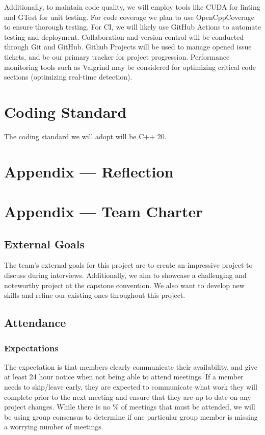 \documentclass{article}
\begin{document}
Additionally, to maintain code quality, we will employ tools like CUDA for linting and GTest for unit testing. 
For code coverage we plan to use OpenCppCoverage to ensure thorough testing.
For CI, we will likely use GitHub Actions to automate testing and deployment.
Collaboration and version control will be conducted through Git and GitHub. Github Projects will be used to manage opened issue tickets, and be our primary tracker for project progression.
Performance monitoring tools such as Valgrind may be considered for optimizing critical code sections (optimizing real-time detection). 

\section{Coding Standard}
The coding standard we will adopt will be C++ 20. 

\newpage{}

\section*{Appendix --- Reflection}



\newpage{}

\section*{Appendix --- Team Charter}

\subsection*{External Goals}

The team's external goals for this project are to create an impressive project
to discuss during interviews. Additionally, we aim to showcase a challenging
and noteworthy project at the capstone convention. We also want to develop new skills 
and refine our existing ones throughout this project.

\subsection*{Attendance}

\subsubsection*{Expectations}

The expectation is that members clearly communicate their availability,
and give at least 24 hour notice when not being able to attend meetings.
If a member needs to skip/leave early, they are expected to communicate 
what work they will complete prior to the next meeting and ensure that
they are up to date on any project changes. While there is no \% of
meetings that must be attended, we will be using group consensus to
determine if one particular group member is missing a worrying number
of meetings.
\end{document}
